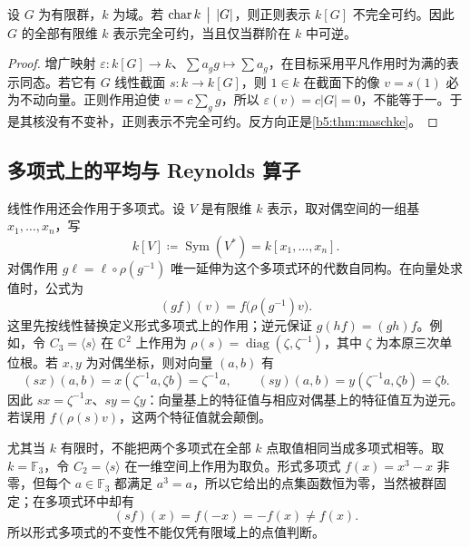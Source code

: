 \begin{proposition}\label{b5:prop:maschke-converse}
	设 \(G\) 为有限群，\(k\) 为域。若 \(\operatorname{char}k\,\bigm\vert\,|G|\)，则正则表示 \(k[G]\) 不完全可约。因此 \(G\) 的全部有限维 \(k\) 表示完全可约，当且仅当群阶在 \(k\) 中可逆。
\end{proposition}
\begin{proof}
	增广映射 \(\varepsilon:k[G]\to k\)、\(\sum a_gg\mapsto\sum a_g\)，在目标采用平凡作用时为满的表示同态。若它有 \(G\) 线性截面 \(s:k\to k[G]\)，则 \(1\in k\) 在截面下的像 \(v=s(1)\) 必为不动向量。正则作用迫使 \(v=c\sum_g g\)，所以 \(\varepsilon(v)=c|G|=0\)，不能等于一。于是其核没有不变补，正则表示不完全可约。反方向正是\cref{b5:thm:maschke}。
\end{proof}

\subsection{多项式上的平均与 Reynolds 算子}
\label{b5:subsec:0103:reynolds}

线性作用还会作用于多项式。设 \(V\) 是有限维 \(k\) 表示，取对偶空间的一组基 \(x_1,\ldots,x_n\)，写
\[
	k[V]\coloneqq\operatorname{Sym}(V^*)=k[x_1,\ldots,x_n].
\]
对偶作用 \(g\ell=\ell\circ\rho(g^{-1})\) 唯一延伸为这个多项式环的代数自同构。在向量处求值时，公式为
\[
	(g f)(v)=f\bigl(\rho(g^{-1})v\bigr).
\]
这里先按线性替换定义形式多项式上的作用；逆元保证 \(g(hf)=(gh)f\)。例如，令 \(C_3=\langle s\rangle\) 在 \(\mathbb C^2\) 上作用为 \(\rho(s)=\operatorname{diag}(\zeta,\zeta^{-1})\)，其中 \(\zeta\) 为本原三次单位根。若 \(x,y\) 为对偶坐标，则对向量 \((a,b)\) 有
\[
	(sx)(a,b)=x(\zeta^{-1}a,\zeta b)=\zeta^{-1}a, \qquad (sy)(a,b)=y(\zeta^{-1}a,\zeta b)=\zeta b.
\]
因此 \(sx=\zeta^{-1}x\)、\(sy=\zeta y\)：向量基上的特征值与相应对偶基上的特征值互为逆元。若误用 \(f(\rho(s)v)\)，这两个特征值就会颠倒。

\ProseParagraphBreak
尤其当 \(k\) 有限时，不能把两个多项式在全部 \(k\) 点取值相同当成多项式相等。取 \(k=\mathbb F_3\)，令 \(C_2=\langle s\rangle\) 在一维空间上作用为取负。形式多项式 \(f(x)=x^3-x\) 非零，但每个 \(a\in\mathbb F_3\) 都满足 \(a^3=a\)，所以它给出的点集函数恒为零，当然被群固定；在多项式环中却有
\[
	(sf)(x)=f(-x)=-f(x)\ne f(x).
\]
所以形式多项式的不变性不能仅凭有限域上的点值判断。

